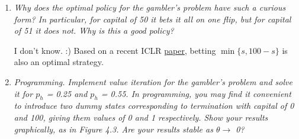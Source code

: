 \documentclass[12pt,a4paper]{article}
\begin{document}
\begin{enumerate}
  \item
    \textit{Why does the optimal policy for the gambler’s problem have such a curious form?
    In particular, for capital of 50 it bets it all on one flip, but for capital of 51 it
    does not. Why is this a good policy?}

    I don't know. :) Based on a recent ICLR \href{https://arxiv.org/pdf/2001.00102.pdf}{paper},
    betting $\min\{s, 100 -s\}$ is also an optimal strategy.

  \item
    \textit{Programming. Implement value iteration for the gambler’s problem and
    solve it for $p_h$ = 0.25 and $p_h$ = 0.55. In programming, you may find it convenient to
    introduce two dummy states corresponding to termination with capital of 0 and 100,
    giving them values of 0 and 1 respectively. Show your results graphically, as in Figure 4.3.
    Are your results stable as $\theta \rightarrow$ 0?}

\end{enumerate}
\end{document}
